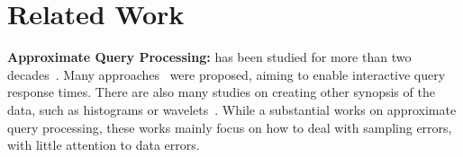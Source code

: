 
\vspace{-1em}
\section{Related Work}\label{sec:rw}
{\noindent \bf Approximate Query Processing:} \saqp has been studied for more than two decades~\cite{DBLP:conf/vldb/GarofalakisG01,DBLP:journals/ftdb/CormodeGHJ12}.
Many \saqp approaches~\cite{DBLP:journals/tods/ChaudhuriDN07,DBLP:conf/eurosys/AgarwalMPMMS13,DBLP:conf/sigmod/AcharyaGPR99,DBLP:conf/cidr/SidirourgosKB11,DBLP:conf/sigmod/BabcockCD03,DBLP:conf/sigmod/HellersteinHW97,DBLP:journals/pvldb/PansareBJC11,DBLP:conf/sigmod/CondieCAHGTES10,DBLP:journals/pvldb/WuJOT09} were proposed, aiming to enable interactive query response times.
There are also many studies on creating other synopsis of the data, such as histograms or wavelets~\cite{DBLP:journals/ftdb/CormodeGHJ12}. While a substantial works on approximate query processing, these works mainly focus on how to deal with sampling errors, with little attention to data errors. 

\vspace{.5em}

